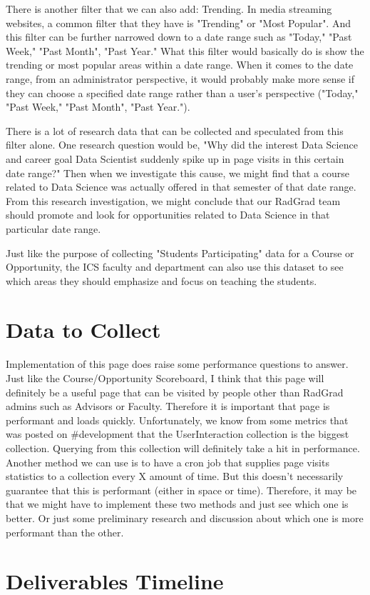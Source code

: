 \documentclass[english]{proposalnsf}
\begin{document}
    There is another filter that we can also add: Trending.
    In media streaming websites, a common filter that they have is "Trending" or "Most Popular".
    And this filter can be further narrowed down to a date range such as "Today," "Past Week," "Past Month", "Past Year." What this filter would basically do is show the trending or most popular areas within a date range.
    When it comes to the date range, from an administrator perspective, it would probably make more sense if they can choose a specified date range rather than a user's perspective ("Today," "Past Week," "Past Month", "Past Year.").

    There is a lot of research data that can be collected and speculated from this filter alone.
    One research question would be, "Why did the interest Data Science and career goal Data Scientist suddenly spike up in page visits in this certain date range?" Then when we investigate this cause, we might find that a course related to Data Science was actually offered in that semester of that date range.
    From this research investigation, we might conclude that our RadGrad team should promote and look for opportunities related to Data Science in that particular date range.

    Just like the purpose of collecting "Students Participating" data for a Course or Opportunity, the ICS faculty and department can also use this dataset to see which areas they should emphasize and focus on teaching the students.

    \section{Data to Collect}
    \label{sec:data-to-collect}
    Implementation of this page does raise some performance questions to answer.
    Just like the Course/Opportunity Scoreboard, I think that this page will definitely be a useful page that can be visited by people other than RadGrad admins such as Advisors or Faculty.
    Therefore it is important that page is performant and loads quickly.
    Unfortunately, we know from some metrics that was posted on #development that the UserInteraction collection is the biggest collection.
    Querying from this collection will definitely take a hit in performance.
    Another method we can use is to have a cron job that supplies page visits statistics to a collection every X amount of time.
    But this doesn't necessarily guarantee that this is performant (either in space or time).
    Therefore, it may be that we might have to implement these two methods and just see which one is better.
    Or just some preliminary research and discussion about which one is more performant than the other.

    \section{Deliverables Timeline}
    \label{sec:deliverables-timeline}

    
    

    \appendix
\end{document}
